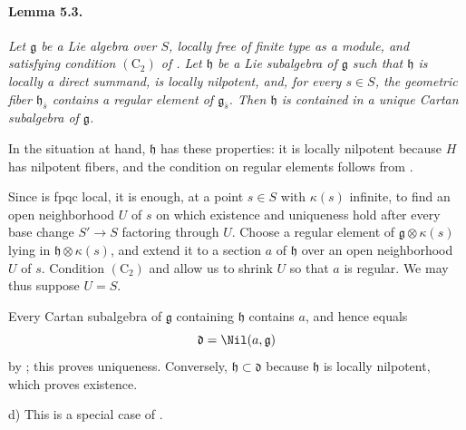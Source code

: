 \paragraph{\textbf{Lemma 5.3.}}
{\itshape Let \(\mathfrak g\) be a Lie algebra over \(S\), locally
free of finite type as a module, and satisfying condition
\((\mathrm C_2)\) of . Let \(\mathfrak h\) be a Lie subalgebra
of \(\mathfrak g\) such that \(\mathfrak h\) is locally a direct
summand, is locally nilpotent, and, for every \(s\in S\), the
geometric fiber \(\mathfrak h_{\bar s}\) contains a regular element
of \(\mathfrak g_{\bar s}\). Then \(\mathfrak h\) is contained in
a unique Cartan subalgebra of \(\mathfrak g\).}

In the situation at hand, \(\mathfrak h\) has these properties: it
is locally nilpotent because \(H\) has nilpotent fibers, and the
condition on regular elements follows from .

Since  is fpqc local, it is enough, at a point \(s\in S\) with
\(\kappa(s)\) infinite, to find an open neighborhood \(U\) of \(s\)
on which existence and uniqueness hold after every base change
\(S'\to S\) factoring through \(U\). Choose a regular element of
\(\mathfrak g\otimes\kappa(s)\) lying in
\(\mathfrak h\otimes\kappa(s)\), and extend it to a section \(a\)
of \(\mathfrak h\) over an open neighborhood \(U\) of \(s\).
Condition \((\mathrm C_2)\) and  allow us to shrink \(U\) so
that \(a\) is regular. We may thus suppose \(U=S\).

Every Cartan subalgebra of \(\mathfrak g\) containing
\(\mathfrak h\) contains \(a\), and hence equals
\[
  \mathfrak d=\Nil(a,\mathfrak g)
\]
by ; this proves uniqueness. Conversely,
\(\mathfrak h\subset\mathfrak d\) because \(\mathfrak h\) is
locally nilpotent, which proves existence.

\smallskip
\noindent
\textup{d)}
This is a special case of \textup{}.



